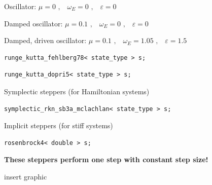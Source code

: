 \begin{frame}[fragile]

 \vspace{4ex}

 \centerline{Oscillator: $\mu=0 \,\, \text{,} \quad \omega_E = 0 \,\, \text{,} \quad \varepsilon=0$}

 \vspace{2ex}
 
\centerline{Damped oscillator: $\mu=0.1 \,\, \text{,} \quad \omega_E = 0 \,\, \text{,} \quad \varepsilon=0$}

 \vspace{2ex}

 \centerline{Damped, driven oscillator: $\mu=0.1 \,\, \text{,} \quad \omega_E = 1.05 \,\, \text{,} \quad \varepsilon=1.5$}
\end{frame}

\begin{frame}[fragile]


  \vspace{2ex}

  \begin{lstlisting}
runge_kutta_fehlberg78< state_type > s;
  \end{lstlisting}

  \begin{lstlisting}
runge_kutta_dopri5< state_type > s;
  \end{lstlisting}

  \vspace{2ex}
  Symplectic steppers (for Hamiltonian systems)
  \begin{lstlisting}
symplectic_rkn_sb3a_mclachlan< state_type > s;
  \end{lstlisting}

  \vspace{2ex}
  Implicit steppers (for stiff systems)
  \begin{lstlisting}
rosenbrock4< double > s;
  \end{lstlisting}

  \vspace{2ex}
  {\bf These steppers perform one step with constant step size!}

\end{frame}

\begin{frame}

 insert graphic

 
\end{frame}




